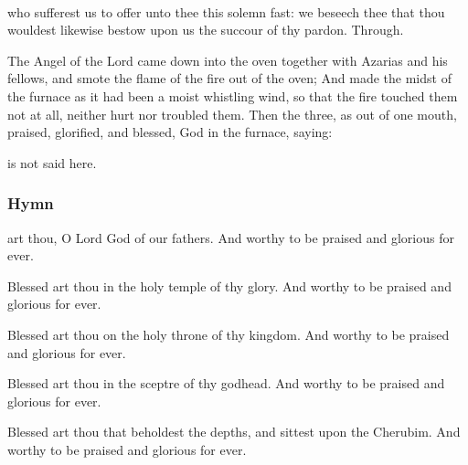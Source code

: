 \\



\vspace{-0.25\baselineskip}

\collect
{} who sufferest us to offer unto thee this solemn fast: we beseech thee that thou wouldest likewise bestow upon us the succour of thy pardon. Through.

 The Angel of the Lord came down into the oven together with Azarias and his fellows, and smote the flame of the fire out of the oven; And made the midst of the furnace as it had been a moist whistling wind, so that the fire touched them not at all, neither hurt nor troubled them. Then the three, as out of one mouth, praised, glorified, and blessed, God in the furnace, saying:

\begin{rubric}
     is not said here.
\end{rubric}

\vspace{-0.25\baselineskip}

\subsubsection{Hymn}
 art thou, O Lord God of our fathers. And worthy to be praised and glorious for ever.


Blessed art thou in the holy temple of thy glory. And worthy to be praised and glorious for ever.

Blessed art thou on the holy throne of thy kingdom. And worthy to be praised and glorious for ever.

Blessed art thou in the sceptre of thy godhead. And worthy to be praised and glorious for ever.

Blessed art thou that beholdest the depths, and sittest upon the Cherubim. And worthy to be praised and glorious for ever.

